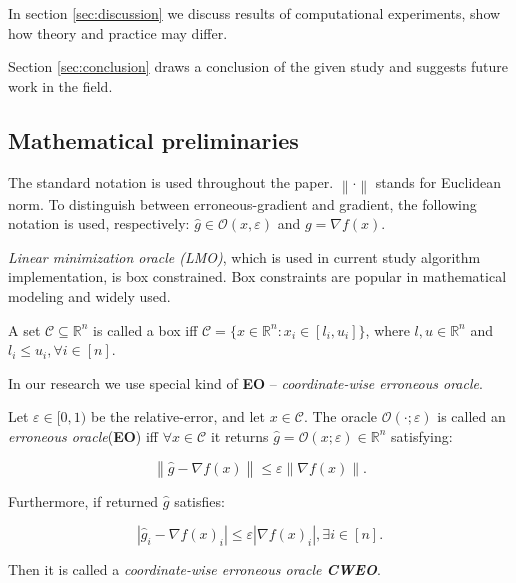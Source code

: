 \documentclass[runningheads, final]{llncs}
\newcommand{\norm}[1]{\left\lVert#1\right\rVert}
\newcommand{\errgrad}{\hat{g}}
\begin{document}
In section \ref{sec:discussion} we discuss results of computational experiments,
show how theory and practice may differ.

Section \ref{sec:conclusion} draws a conclusion of the given study and suggests
future work in the field.

\subsection{Mathematical preliminaries}

The standard notation is used throughout the paper. $\norm{\cdot}$ stands for
Euclidean norm. To distinguish between erroneous-gradient and gradient, the
following notation is used, respectively:
$\errgrad \in \mathcal{O}(x, \varepsilon)$ and $g = \nabla f(x)$.

\textit{Linear minimization oracle (LMO)}, which is used in current study
algorithm implementation, is box constrained. Box constraints are popular in
mathematical modeling and widely used.

\begin{definition}
    A set $\mathcal{C} \subseteq \mathbb{R}^n$ is called a box iff
    $\mathcal{C} = \{x \in \mathbb{R}^n: x_i \in [l_i, u_i]\}$, where $l, u \in
        \mathbb{R}^n$ and $l_i \leqslant u_i, \forall i \in [n]$.
\end{definition}

In our research we use special kind of \textbf{EO} -- \textit{coordinate-wise
    erroneous oracle}.

\begin{definition}
    Let $\varepsilon \in [0, 1)$ be the relative-error, and let
    $x \in \mathcal{C}$. The oracle $\mathcal{O}(\cdot; \varepsilon)$ is called
    an \textit{erroneous oracle}(\textbf{EO}) iff $\forall x \in \mathcal{C}$ it
    returns $\errgrad = \mathcal{O}(x; \varepsilon) \in \mathbb{R}^n$
    satisfying:

    \begin{equation}
        \norm{\errgrad - \nabla f(x)} \leqslant \varepsilon \norm{\nabla f(x)}.
    \end{equation}

    Furthermore, if returned $\errgrad$ satisfies:

    \begin{equation}
        |\errgrad_i - \nabla f(x)_i| \leqslant \varepsilon |\nabla f(x)_i|,
        \exists i \in [n].
    \end{equation}

    Then it is called a \textit{coordinate-wise erroneous oracle \textbf{CWEO}}.

\end{definition}
\end{document}
